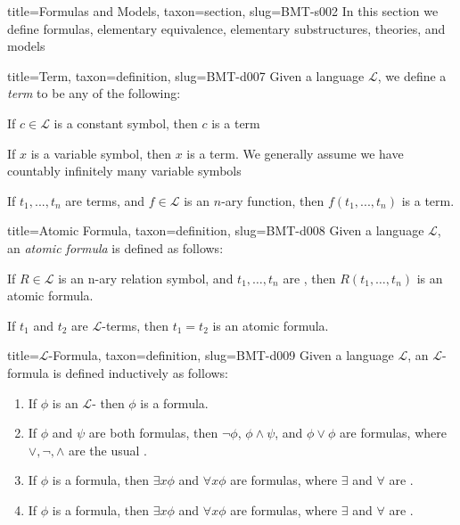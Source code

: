 \documentclass[a4paper]{article}
\begin{document}
\begin{tree}{title={Formulas and Models}, taxon={section}, slug={BMT-s002}}
In this section we define formulas, elementary equivalence, elementary substructures, theories, and models
\begin{tree}{title={Term}, taxon={definition}, slug={BMT-d007}}
Given a language \(\mathcal {L}\), we define a \emph{term} to be any of the following:\par{If \(c \in   \mathcal {L}\) is a constant symbol, then \(c\) is a term}\par{If \(x\) is a variable symbol, then \(x\) is a term. We generally assume we have countably infinitely many variable symbols}\par{If \(t_1,..., t_n\) are terms, and \(f \in   \mathcal {L}\) is an \(n\)-ary function, then \(f(t_1,..., t_n)\) is a term.}
\end{tree}

\begin{tree}{title={Atomic Formula}, taxon={definition}, slug={BMT-d008}}
Given a language \(\mathcal {L}\), an \emph{atomic formula} is defined as follows:\par{If \(R \in   \mathcal {L}\) is an n-ary relation symbol, and \(t_1, \dots , t_n\) are , then \(R(t_1, \dots , t_n)\) is an atomic formula.}\par{If \(t_1\) and \(t_2\) are \(\mathcal {L}\)-terms, then \(t_1 = t_2\) is an atomic formula. }
\end{tree}

\begin{tree}{title={\(\mathcal {L}\)-Formula}, taxon={definition}, slug={BMT-d009}}
Given a language \(\mathcal {L}\), an \(\mathcal {L}\)-formula is defined inductively as follows:\par{\begin{enumerate}
\item{
            If \(\phi\) is an \(\mathcal {L}\)- then \(\phi\) is a formula.
        }
        \item{
            If \(\phi\) and \(\psi\) are both formulas, then \(\neg \phi\), \(\phi   \land   \psi\), and 
            \(\phi \lor \phi\) are formulas, where \(\lor , \neg , \land\) are the usual .
        }
        \item{
            If \(\phi\) is a formula, then \(\exists  x  \phi\) and \(\forall  x  \phi\) are formulas, 
            where \(\exists\) and \(\forall\) are .
        }
        \item{
            If \(\phi\) is a formula, then \(\exists  x  \phi\) and \(\forall  x  \phi\) are formulas, 
            where \(\exists\) and \(\forall\) are .
        }
\end{enumerate}}
\end{tree}


\end{tree}
\end{document}

